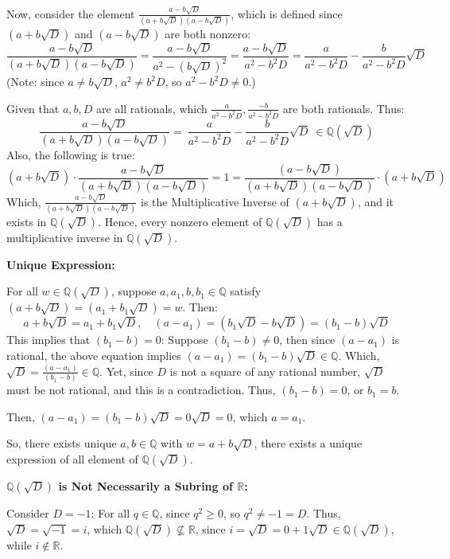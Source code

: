 \documentclass{article}
\begin{document}
\hfill

Now, consider the element $\frac{a-b\sqrt{D}}{(a+b\sqrt{D})(a-b\sqrt{D})}$, which is defined since $(a+b\sqrt{D})$ and $(a-b\sqrt{D})$ are both nonzero:
$$\frac{a-b\sqrt{D}}{(a+b\sqrt{D})(a-b\sqrt{D})}=\frac{a-b\sqrt{D}}{a^2-(b\sqrt{D})^2} = \frac{a-b\sqrt{D}}{a^2-b^2D} = \frac{a}{a^2-b^2D}-\frac{b}{a^2-b^2D}\sqrt{D}$$
(Note: since $a\neq b\sqrt{D}$, $a^2\neq b^2D$, so $a^2-b^2D \neq 0$.)

Given that $a,b,D$ are all rationals, which $\frac{a}{a^2-b^2D}, \frac{-b}{a^2-b^2D}$ are both rationals. Thus:
$$\frac{a-b\sqrt{D}}{(a+b\sqrt{D})(a-b\sqrt{D})}=\ \frac{a}{a^2-b^2D}-\frac{b}{a^2-b^2D}\sqrt{D}\ \in \mathbb{Q}(\sqrt{D})$$
Also, the following is true:
$$(a+b\sqrt{D})\cdot \frac{a-b\sqrt{D}}{(a+b\sqrt{D})(a-b\sqrt{D})} = 1 = \frac{(a-b\sqrt{D})}{(a+b\sqrt{D})(a-b\sqrt{D})}\cdot (a+b\sqrt{D})$$
Which, $\frac{a-b\sqrt{D}}{(a+b\sqrt{D})(a-b\sqrt{D})}$ is the Multiplicative Inverse of $(a+b\sqrt{D})$, and it exists in $\mathbb{Q}(\sqrt{D})$.
Hence, every nonzero element of $\mathbb{Q}(\sqrt{D})$ has a multiplicative inverse in $\mathbb{Q}(\sqrt{D})$.

\hfill

\textbf{Unique Expression:}

For all $w\in\mathbb{Q}(\sqrt{D})$, suppose $a,a_1,b,b_1\in\mathbb{Q}$ satisfy $(a+b\sqrt{D})=(a_1+b_1\sqrt{D})=w$. Then:
$$a+b\sqrt{D}=a_1+b_1\sqrt{D},\quad (a-a_1)=(b_1\sqrt{D}-b\sqrt{D}) = (b_1-b)\sqrt{D}$$
This implies that $(b_1-b)=0$: Suppose $(b_1-b)\neq 0$, then since $(a-a_1)$ is rational, the above equation implies $(a-a_1)=(b_1-b)\sqrt{D}\in\mathbb{Q}$.
Which, $\sqrt{D}=\frac{(a-a_1)}{(b_1-b)}\in\mathbb{Q}$. Yet, since $D$ is not a square of any rational number, $\sqrt{D}$ must be not rational, 
and this is a contradiction. Thus, $(b_1-b)=0$, or $b_1=b$.

Then, $(a-a_1)=(b_1-b)\sqrt{D} = 0\sqrt{D} = 0$, which $a=a_1$.

So, there exists unique $a,b\in\mathbb{Q}$ with $w=a+b\sqrt{D}$, there exists a unique expression of all element of $\mathbb{Q}(\sqrt{D})$.

\hfill

\textbf{$\mathbb{Q}(\sqrt{D})$ is Not Necessarily a Subring of $\mathbb{R}$:}

Consider $D=-1$: For all $q\in\mathbb{Q}$, since $q^2 \geq 0$, so $q^2\neq -1=D$. Thus, $\sqrt{D}=\sqrt{-1}=i$, which $\mathbb{Q}(\sqrt{D}) \not\subseteq \mathbb{R}$,
since $i = \sqrt{D} = 0+1\sqrt{D} \in \mathbb{Q}(\sqrt{D})$, while $i\notin \mathbb{R}$.
\end{document}
